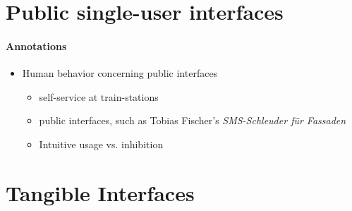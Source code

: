 

\section{Public single-user interfaces}
\label{motivation_single}

\paragraph{Annotations}

\begin{itemize}
	\item Human behavior concerning public interfaces
	\begin{itemize}
		\item self-service at train-stations
		\item public interfaces, such as Tobias Fischer's \textit{SMS-Schleuder für Fassaden}
		\item Intuitive usage vs. inhibition
	\end{itemize}
\end{itemize}

\section{Tangible Interfaces}
\label{related_work_tangible}

